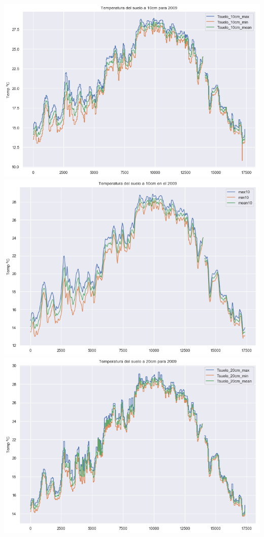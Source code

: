 \documentclass{article}
\begin{document}
\begin{center}
    \includegraphics[scale = 0.3]{TG10.png}
    \includegraphics[scale = 0.3]{TG10S.png}
    \includegraphics[scale = 0.3]{TG20.png}

\end{center}
\end{document}
